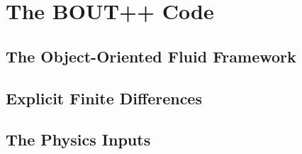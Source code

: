 \chapter{The BOUT++ Code}

\section{The Object-Oriented Fluid Framework}

\section{Explicit Finite Differences}

\section{The Physics Inputs}
